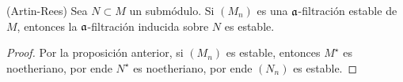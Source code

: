 \begin{corollary}
(Artin-Rees) Sea $N \subset M$ un submódulo. Si $(M_n)$ es una $\mathfrak a$-filtración estable de $M$, entonces la $\mathfrak a$-filtración inducida sobre $N$ es estable.
\end{corollary}

\begin{proof}
Por la proposición anterior, si $(M_n)$ es estable, entonces $M^\star$ es noetheriano, por ende $N^\star$ es noetheriano, por ende $(N_n)$ es estable.
\end{proof}
